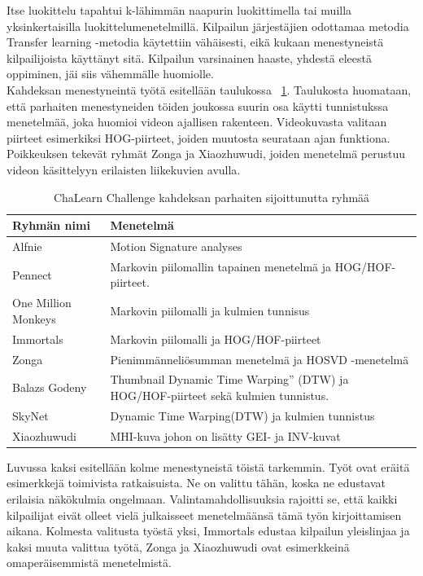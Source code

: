 Itse luokittelu tapahtui k-lähimmän naapurin luokittimella tai muilla yksinkertaisilla luokittelumenetelmillä. 
Kilpailun järjestäjien odottamaa metodia Transfer learning -metodia käytettiin vähäisesti, eikä kukaan menestyneistä kilpailijoista käyttänyt sitä.
Kilpailun varsinainen haaste, yhdestä eleestä oppiminen, jäi siis vähemmälle huomiolle. \citep {6239178} \\

Kahdeksan menestyneintä työtä esitellään taulukossa ~\ref{table:dvbt_param}. Taulukosta huomataan, että parhaiten menestyneiden töiden
joukossa suurin osa käytti tunnistukssa menetelmää, joka huomioi videon ajallisen rakenteen. Videokuvasta valitaan piirteet esimerkiksi HOG-piirteet, joiden
muutosta seurataan ajan funktiona. Poikkeuksen tekevät ryhmät Zonga ja Xiaozhuwudi, joiden menetelmä perustuu videon käsittelyyn erilaisten liikekuvien avulla. 

\begin{table}[th]
\caption{ChaLearn Challenge kahdeksan parhaiten sijoittunutta ryhmää}
\label{table:dvbt_param}
\begin{center}
\begin{tabular}{|p{}|p{}|} 
    \hline
Ryhmän nimi & Menetelmä \\
    \hline
    \hline
Alfnie & Motion Signature analyses\\ 
    \hline
Pennect & Markovin piilomallin tapainen menetelmä ja HOG/HOF-piirteet.\\
    \hline
One Million Monkeys & Markovin piilomalli ja kulmien tunnisus\\
    \hline
Immortals & Markovin piilomalli ja HOG/HOF-piirteet\\
    \hline
Zonga & Pienimmänneliösumman menetelmä ja HOSVD -menetelmä\\
    \hline
Balazs Godeny & Thumbnail Dynamic Time Warping” (DTW) ja HOG/HOF-piirteet sekä kulmien tunnistus.\\
    \hline
SkyNet & Dynamic Time Warping(DTW) ja kulmien tunnistus\\
    \hline
Xiaozhuwudi & MHI-kuva johon on lisätty GEI- ja INV-kuvat\\
    \hline	
\end{tabular}
\end{center}
\end{table}

Luvussa kaksi esitellään kolme menestyneistä töistä tarkemmin. Työt ovat eräitä esimerkkejä toimivista ratkaisuista. Ne on valittu tähän, 
koska ne edustavat erilaisia näkökulmia ongelmaan. Valintamahdollisuuksia rajoitti se, että kaikki kilpailijat eivät olleet vielä julkaisseet 
menetelmäänsä tämä työn kirjoittamisen aikana. Kolmesta valitusta työstä yksi, Immortals edustaa kilpailun yleislinjaa ja kaksi muuta valittua työtä,
Zonga ja Xiaozhuwudi ovat esimerkkeinä omaperäisemmistä menetelmistä.\\

